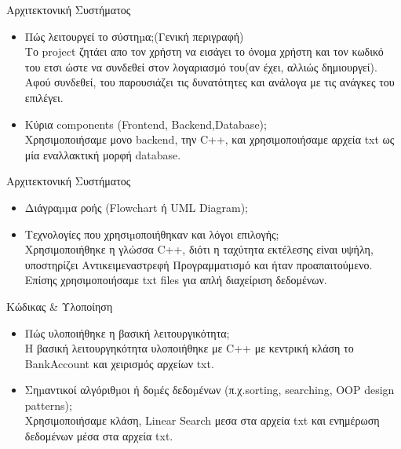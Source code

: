 \documentclass{beamer}
\begin{document}
\begin{frame}{Αρχιτεκτονική Συστήματος}
\begin{itemize}
  \item Πώς λειτουργεί το σύστηµα;(Γενική περιγραφή)
  \vspace{0.2cm}
  \\ Το project ζητάει απο τον χρήστη να εισάγει το όνομα χρήστη και τον κωδικό του ετσι ώστε να συνδεθεί στον λογαριασμό του(αν έχει, αλλιώς δημιουργεί). Αφού συνδεθεί, του παρουσιάζει τις δυνατότητες και ανάλογα με τις ανάγκες του επιλέγει.
  \vspace{0.5cm}
  \item Κύρια components (Frontend, Backend,Database);
  \vspace{0.2cm}
  \\ Χρησιμοποιήσαμε μονο backend, την C++, και χρησιμοποιήσαμε αρχεία txt ως μία εναλλακτική μορφή database.
\end{itemize}
\end{frame}

\begin{frame}{Αρχιτεκτονική Συστήματος}
\begin{itemize}
  \item Διάγραµµα ροής (Flowchart ή UML Diagram);
   \vspace{0.2cm}
   \\
  \item Τεχνολογίες που χρησιµοποιήθηκαν και λόγοι επιλογής;
  \vspace{0.2cm}
  \\ Χρησιμοποιήθηκε η γλώσσα C++, διότι η ταχύτητα εκτέλεσης είναι υψήλη, υποστηρίζει Αντικειμεναστρεφή Προγραμματισμό και ήταν προαπαιτούμενο. Επίσης χρησιμοποιήσαμε txt files για απλή διαχείριση δεδομένων.
\end{itemize}
\end{frame}

\begin{frame}{Κώδικας \& Υλοποίηση}
\begin{itemize}
  \item Πώς υλοποιήθηκε η βασική λειτουργικότητα;
  \vspace{0.2cm}
  \\ Η βασική λειτουργηκότητα υλοποιήθηκε με C++ με κεντρική κλάση το BankAccount και χειρισμός αρχείων txt.
  \vspace{0.5cm}
  \item Σηµαντικοί αλγόριθµοι ή δοµές δεδοµένων (π.χ.sorting, searching, OOP design patterns);
  \vspace{0.2cm}
  \\ Χρησιμοποιήσαμε κλάση, Linear Search μεσα στα αρχεία txt και ενημέρωση δεδομένων μέσα στα αρχεία txt.
  \vspace{0.5cm}
  
  
\end{itemize}
\end{frame}
\end{document}
